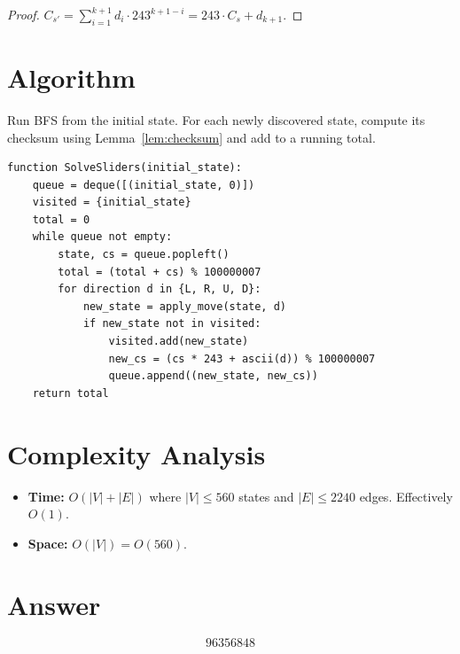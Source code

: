 \documentclass[12pt]{article}
\begin{document}
\begin{proof}
$C_{s'}=\sum_{i=1}^{k+1}d_i\cdot 243^{k+1-i}=243\cdot C_s+d_{k+1}$.
\end{proof}

\section{Algorithm}

Run BFS from the initial state. For each newly discovered state, compute its checksum using Lemma~\ref{lem:checksum} and add to a running total.

\begin{verbatim}
function SolveSliders(initial_state):
    queue = deque([(initial_state, 0)])
    visited = {initial_state}
    total = 0
    while queue not empty:
        state, cs = queue.popleft()
        total = (total + cs) % 100000007
        for direction d in {L, R, U, D}:
            new_state = apply_move(state, d)
            if new_state not in visited:
                visited.add(new_state)
                new_cs = (cs * 243 + ascii(d)) % 100000007
                queue.append((new_state, new_cs))
    return total
\end{verbatim}

\section{Complexity Analysis}

\begin{itemize}
\item \textbf{Time:} $O(|V|+|E|)$ where $|V|\le 560$ states and $|E|\le 2240$ edges. Effectively $O(1)$.
\item \textbf{Space:} $O(|V|)=O(560)$.
\end{itemize}

\section{Answer}

\[
\boxed{96356848}
\]
\end{document}
